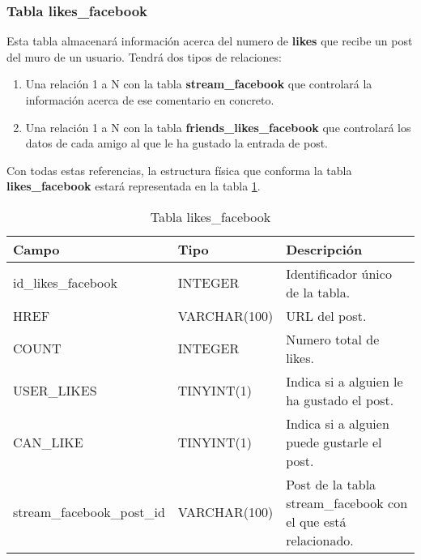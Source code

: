 \subsubsection{Tabla likes\_facebook}
Esta tabla almacenará información acerca del numero de \textbf{likes} que recibe un post del muro de un usuario. Tendrá dos tipos de relaciones:
\begin{enumerate}
\item Una relación 1 a N con la tabla \textbf{stream\_facebook} que controlará la información acerca de ese comentario en concreto.
\item Una relación 1 a N con la tabla \textbf{friends\_likes\_facebook} que controlará los datos de cada amigo al que le ha gustado la entrada de post.
\end{enumerate}
\bigskip
\par
Con todas estas referencias, la estructura física que conforma la tabla \textbf{likes\_facebook} estará representada en la tabla \ref{tabLikesFacebook}.
\bigskip
\par
\begin{table}[h]
\begin{center}
\begin{tabular}{| l | l | p{60mm} |}\hline
\textbf{Campo}&\textbf{Tipo}&\textbf{Descripción} \\ \hline
id\_likes\_facebook & INTEGER & Identificador único de la tabla. \\ \hline
HREF & VARCHAR(100) & URL del post. \\ \hline
COUNT & INTEGER &  Numero total de likes.\\ \hline
USER\_LIKES & TINYINT(1) & Indica si a alguien le ha gustado el post. \\ \hline
CAN\_LIKE & TINYINT(1) & Indica si a alguien puede gustarle el post. \\ \hline
stream\_facebook\_post\_id & VARCHAR(100) & Post de la tabla stream\_facebook con el que está relacionado. \\ \hline
\end{tabular}
\end{center}
\caption{Tabla likes\_facebook} \label{tabLikesFacebook}
\end{table}

